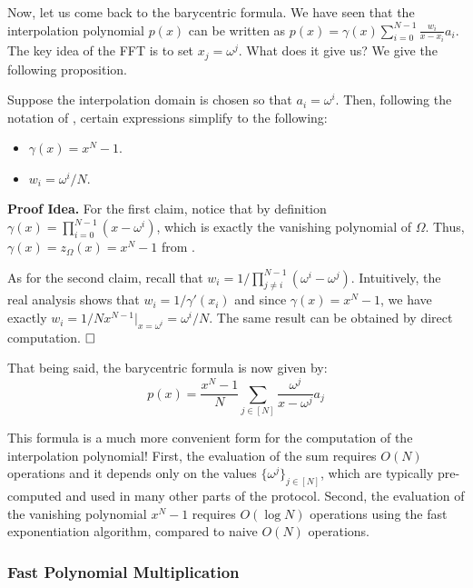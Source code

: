 \documentclass[../lecture-notes-148x210.tex]{subfiles}
\begin{document}
Now, let us come back to the barycentric formula. We have seen that the
interpolation polynomial $p(x)$ can be written as $p(x) = \gamma(x) 
\sum_{i=0}^{N-1} \frac{w_i}{x-x_i}a_i$. The key idea of the FFT is to
set $x_j = \omega^j$. What does it give us? We give the following proposition.

\begin{proposition}
    Suppose the interpolation domain is chosen so that $a_i = \omega^i$. Then, 
    following the notation of , certain expressions 
    simplify to the following:
    \begin{itemize}
        \item $\gamma(x) = x^N-1$.
        \item $w_i = \omega^i/N$.
    \end{itemize}
\end{proposition}

\textbf{Proof Idea.} For the first claim, notice that
by definition $\gamma(x) = \prod_{i=0}^{N-1}(x-\omega^i)$, which is exactly 
the vanishing polynomial of $\Omega$. Thus, $\gamma(x) = z_{\Omega}(x) = x^N-1$
from . 

As for the second claim, recall that $w_i = 1/\prod_{j \neq
i}^{N-1}(\omega^i-\omega^j)$. Intuitively, the real analysis
shows that $w_i = 1/\gamma'(x_i)$ and since $\gamma(x)=x^N-1$, we 
have exactly $w_i = 1/Nx^{N-1}\Big|_{x=\omega^i}=\omega^i/N$. The same 
result can be obtained by direct computation. $\hfill\Box$

That being said, the barycentric formula is now given by:
\begin{equation*}
    p(x) = \frac{x^N-1}{N} \sum_{j \in [N]} \frac{\omega^j}{x-\omega^j}a_j
\end{equation*}

This formula is a much more convenient form for the computation of the
interpolation polynomial! First, the evaluation of the sum requires $O(N)$
operations and it depends only on the values $\{\omega^j\}_{j \in [N]}$,
which are typically pre-computed and used in many other parts of the protocol.
Second, the evaluation of the vanishing polynomial $x^N-1$ requires $O(\log N)$
operations using the fast exponentiation algorithm, compared to naive 
$O(N)$ operations. 

\subsubsection{Fast Polynomial Multiplication}
\end{document}

